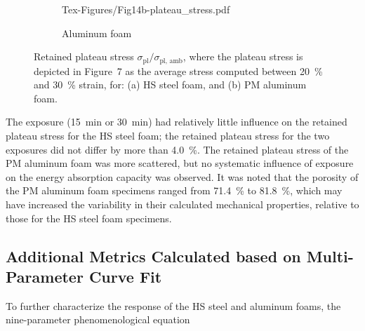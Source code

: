 \documentclass[review]{elsarticle}
\begin{document}
\begin{figure}
\begin{subfigure}{.5\textwidth}
		{Tex-Figures/Fig14b-plateau_stress.pdf}
		\caption{Aluminum foam}
		\label{fig3:sub2}
	\end{subfigure}
	\caption{Retained plateau stress $\sigma_\text{pl}/\sigma_\text{pl,~amb}$, where the plateau stress is depicted in Figure~7 as the average stress computed between 20~\% and 30~\% strain, for: (a) HS steel foam, and (b) PM aluminum foam.}
	\label{Plateu_stress}
\end{figure}

The exposure (15~min or 30~min) had relatively little influence on the retained plateau stress for the HS steel foam; the retained plateau stress for the two exposures did not differ by more than 4.0~\%. The retained plateau stress of the PM aluminum foam was more scattered, but no systematic influence of exposure on the energy absorption capacity was observed. It was noted that the porosity of the PM aluminum foam specimens ranged from 71.4~\% to 81.8~\%, which may have increased the variability in their calculated mechanical properties, relative to those for the HS steel foam specimens.

\subsection{Additional Metrics Calculated based on Multi-Parameter Curve Fit}

To further characterize the response of the HS steel and aluminum foams, the nine-parameter phenomenological equation
\end{document}
